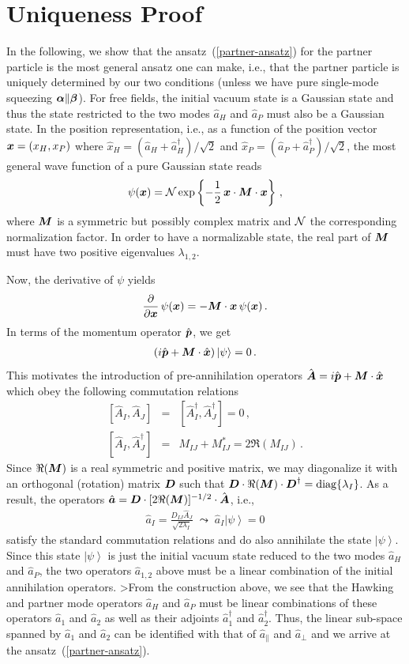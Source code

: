 \documentclass[aps,prd,showpacs,amssymb,nofootinbib,twocolumn]{revtex4}
\newcommand{\ket}[1]{\left|#1\right>}
\newcommand{\nn}{\nonumber\\}
\newcommand{\f}[1]{\mbox{\boldmath$#1$}}
\newcommand{\bea}{\begin{eqnarray}}
\newcommand{\ea}{\end{eqnarray}}
\begin{document}
\appendix 

\section{Uniqueness Proof}

In the following, we show that the ansatz~(\ref{partner-ansatz}) for the 
partner particle is the most general ansatz one can make, i.e., that the 
partner particle is uniquely determined by our two conditions 
(unless we have pure single-mode squeezing $\f{\alpha}\|\f{\beta}$).
%
For free fields, the initial vacuum state is a Gaussian state and thus 
the state restricted to the two modes $\hat a_H$ and $\hat a_P$ 
must also be a Gaussian state. 
%
In the position representation, i.e., as a function of the position vector
$\f{x}=(x_H,x_P)$ where 
$\hat x_H=(\hat a_H+\hat a_H^\dagger)/\sqrt{2}$ and 
$\hat x_P=(\hat a_P+\hat a_P^\dagger)/\sqrt{2}$, 
the most general wave function of a pure Gaussian state reads 
%
\bea
\psi(\f{x})={\cal N}\exp\left\{-\frac12\,\f{x}\cdot\f{M}\cdot\f{x}\right\}
\,,
\ea
%
where $\f{M}$ is a symmetric but possibly complex matrix 
and $\cal N$ the corresponding normalization factor.
%
In order to have a normalizable state, the real part of $\f{M}$ 
must have two positive eigenvalues $\lambda_{1,2}$. 

Now, the derivative of $\psi$ yields 
%
\bea
\frac{\partial}{\partial\f{x}}\,\psi(\f{x})=-\f{M}\cdot\f{x}\,\psi(\f{x})
\,.
\ea
%
In terms of the momentum operator $\hat{\f{p}}$, we get  
%
\bea
\label{appendix-annihilation}
\left(i\hat{\f{p}}+\f{M}\cdot\hat{\f{x}}
\right)\ket{\psi}=0
\,.
\ea
%
This motivates the introduction of pre-annihilation operators 
$\hat{\f{A}}=i\hat{\f{p}}+\f{M}\cdot\hat{\f{x}}$ which obey the 
following commutation relations
%
\bea
\left[\hat A_I,\hat A_J\right]
&=&
\left[\hat A_I^\dagger,\hat A_J^\dagger\right]
=0
\,,
\nn
\left[\hat A_I,\hat A_J^\dagger\right]
&=&
M_{IJ}+M_{IJ}^*=2\Re(M_{IJ})
\,.
\ea
%
Since $\Re(\f{M})$ is a real symmetric and positive matrix, we may
diagonalize it with an orthogonal (rotation) matrix $\f{D}$
such that
$\f{D}\cdot\Re(\f{M})\cdot\f{D}^\dagger={\rm diag}\{\lambda_I\}$.
%
As a result, the operators 
$\hat{\f{a}}=\f{D}\cdot[2\Re(\f{M})]^{-1/2}\cdot\hat{\f{A}}$,
i.e., 
%
\bea
\hat a_I=\frac{D_{IJ}\hat A_J}{\sqrt{2\lambda_I}}
\;\leadsto\;
\hat a_I\ket{\psi}=0
\ea
%
satisfy the standard commutation relations and do also annihilate the 
state $\ket{\psi}$.
%
Since this state $\ket{\psi}$ is just the initial vacuum state reduced to the 
two modes $\hat a_H$ and $\hat a_P$, the two operators
$\hat a_{1,2}$ above must be a linear combination of the initial 
annihilation operators.
%
>From the construction above, we see that the Hawking and partner mode 
operators $\hat a_H$ and $\hat a_P$ must be linear combinations of 
these operators $\hat a_1$ and $\hat a_2$ as well as their adjoints 
$\hat a_1^\dagger$ and $\hat a_2^\dagger$. 
%
Thus, the linear sub-space spanned by $\hat a_1$ and $\hat a_2$ 
can be identified with that of $\hat a_\|$ and $\hat a_\perp$ and 
we arrive at the ansatz~(\ref{partner-ansatz}).  
\end{document}
